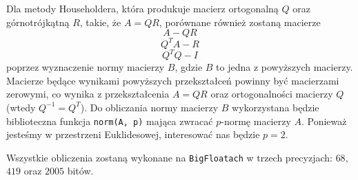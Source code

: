 Dla metody Householdera, która produkuje macierz ortogonalną $Q$ oraz górnotrójkątną $R$, takie, że $A=QR$, porównane również zostaną macierze
$$A-QR$$
$$Q^TA-R$$
$$Q^TQ-I$$
poprzez wyznaczenie normy macierzy $B$, gdzie $B$ to jedna z powyższych macierzy. Macierze będące wynikami powyższych przekształceń powinny być macierzami zerowymi, co wynika z przekształcenia $A=QR$ oraz ortogonalności macierzy $Q$ (wtedy $Q^{-1}=Q^T$). Do obliczania normy macierzy $B$ wykorzystana będzie biblioteczna funkcja \verb+norm(A, p)+ mająca zwracać $p$-normę macierzy $A$. Ponieważ jesteśmy w przestrzeni Euklidesowej, interesować nas będzie $p=2$. 

Wszystkie obliczenia zostaną wykonane na \verb+BigFloatach+ w trzech precyzjach: $68$, $419$ oraz $2005$ bitów.